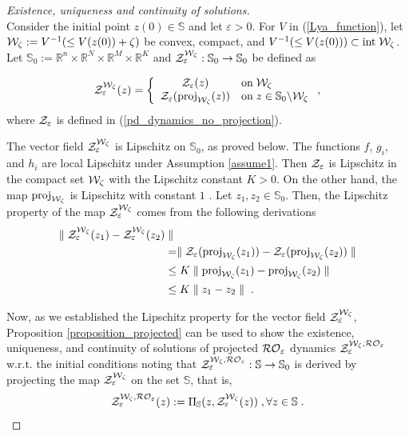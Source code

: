 \documentclass[journal,twoside,web]{ieeecolor}
\begin{document}
\begin{proof} [Existence, uniqueness and continuity of solutions]\\
Consider the initial point $z(0) \in {\mathbb S}$ and let $\varepsilon > 0$. For $V$ in (\ref{Lya_function}), let ${\cal W}_\zeta:=V^{-1}(\leq V(z(0))+\zeta)$ be convex, compact, and $V^{-1}(\leq V(z(0))) \subset \text{int} \; {\cal W}_\zeta$. Let $\mathbb{S}_0:=\mathbb{R}^n\times \mathbb{R}^N\times \mathbb{R}^M\times \mathbb{R}^K$ and ${\cal Z}_\varepsilon^{{\cal W}_\zeta}: \mathbb{S}_0 \rightarrow \mathbb{S}_0$ be defined as

\begin{align*}
{\cal Z}_\varepsilon^{{\cal W}_\zeta}(z)=\left\{
\begin{array}{cl}
{\cal Z}_\varepsilon(z) & \text{on} \; {{\cal W}_\zeta}\\
{\cal Z}_\varepsilon(\text{proj}_{{\cal W}_\zeta}(z)) & \text{on} \; z \in \mathbb{S}_0 \text{\textbackslash} {{\cal W}_\zeta}
\end{array}\right.,
\end{align*}
where ${\cal Z}_\varepsilon$ is defined in (\ref{pd_dynamics_no_projection}).

The vector field ${\cal Z}_\varepsilon^{{\cal W}_\zeta}$ is Lipschitz on $\mathbb{S}_0$, as proved below. The functions $f$, $g_i$, and $h_i$ are local Lipschitz under Assumption \ref{assume1}. Then ${\cal Z}_\varepsilon$ is Lipschitz in the compact set ${\cal W}_\zeta$ with the Lipschitz constant $K>0$. On the other hand, the map $\text{proj}_{{\cal W}_\zeta}$ is Lipschitz with constant $1$ \cite[Proposition~2.4.1]{clarke1983}. Let $z_1,z_2 \in \mathbb S_0$. Then, the Lipschitz property of the map ${\cal Z}_\varepsilon^{{\cal W}_\zeta}$ comes from the following derivations
\begin{align*}
\parallel {\cal Z}_\varepsilon^{{\cal W}_\zeta}(z_1)-{\cal Z}_\varepsilon^{{\cal W}_\zeta}(z_2) & \parallel\\
&=\parallel {\cal Z}_\varepsilon(\text{proj}_{{\cal W}_\zeta}(z_1))-{\cal Z}_\varepsilon(\text{proj}_{{\cal W}_\zeta}(z_2)) \parallel\\
&\leq K \parallel \text{proj}_{{\cal W}_\zeta}(z_1)-\text{proj}_{{\cal W}_\zeta}(z_2) \parallel\\
&\leq K \parallel z_1-z_2 \parallel\;.
\end{align*}

Now, as we established the Lipschitz property for the vector field ${\cal Z}_\varepsilon^{{\cal W}_\zeta}$, Proposition \ref{proposition_projected} can be used to show the existence, uniqueness, and continuity of solutions of projected ${\cal RO}_\varepsilon$ dynamics ${\cal Z}_\varepsilon^{{\cal W}_\zeta, {\cal RO}_\varepsilon}$ w.r.t. the initial conditions noting that ${\cal Z}_\varepsilon^{{\cal W}_\zeta, {\cal RO}_\varepsilon}:\mathbb S \rightarrow \mathbb S_0$ is derived by projecting the map ${\cal Z}_\varepsilon^{{\cal W}_\zeta}$ on the set $\mathbb S$, that is,
\begin{align*}
{\cal Z}_\varepsilon^{{\cal W}_\zeta, {\cal RO}_\varepsilon}(z):=\Pi_{\mathbb S}(z,{\cal Z}_\varepsilon^{{\cal W}_\zeta}(z))\;, \forall z \in \mathbb S\;.
\end{align*}


\end{proof}
\end{document}
